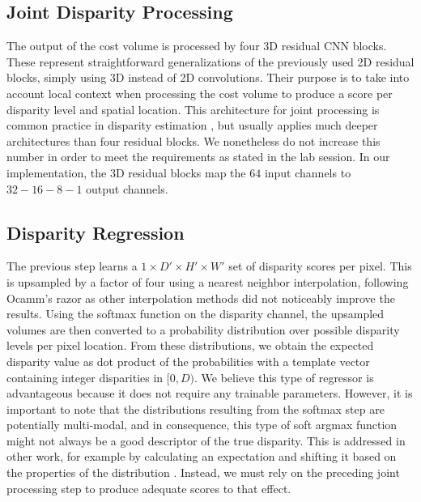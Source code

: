 \documentclass[runningheads]{llncs}
\begin{document}
\subsection{Joint Disparity Processing}\label{Sec:Joint_Processing}
The output of the cost volume is processed by four 3D residual CNN blocks. These represent straightforward generalizations of the previously used 2D residual blocks, simply using 3D instead of 2D convolutions. Their purpose is to take into account local context when processing the cost volume to produce a score per disparity level and spatial location. This architecture for joint processing is common practice in disparity estimation \cite{Cost_Volume}, but usually applies much deeper architectures than four residual blocks. We nonetheless do not increase this number in order to meet the requirements as stated in the lab session. In our implementation, the 3D residual blocks map the $64$ input channels to $32-16-8-1$ output channels.

\subsection{Disparity Regression}
The previous step learns a $1 \times D' \times H' \times W'$ set of disparity scores per pixel. This is upsampled by a factor of four using a nearest neighbor interpolation, following Ocamm's razor as other interpolation methods did not noticeably improve the results. Using the softmax function on the disparity channel, the upsampled volumes are then converted to a probability distribution over possible disparity levels per pixel location. From these distributions, we obtain the expected disparity value as dot product of the probabilities with a template vector containing integer disparities in $[0, D)$. We believe this type of regressor is advantageous because it does not require any trainable parameters. However, it is important to note that the distributions resulting from the softmax step are potentially multi-modal, and in consequence, this type of soft argmax function might not always be a good descriptor of the true disparity. This is addressed in other work, for example by calculating an expectation and shifting it based on the properties of the distribution \cite{Wasserstein_Dist_Disp_Estimation}. Instead, we must rely on the preceding joint processing step to produce adequate scores to that effect.
\end{document}
